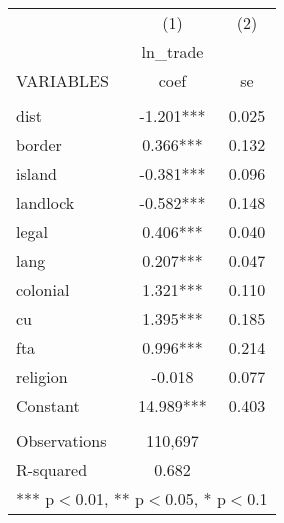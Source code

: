 \documentclass[]{article}
\begin{document}
\begin{tabular}{lcc} \hline
 & (1) & (2) \\
 & ln\_trade &  \\
VARIABLES & coef & se \\ \hline
 &  &  \\
dist & -1.201*** & 0.025 \\
border & 0.366*** & 0.132 \\
island & -0.381*** & 0.096 \\
landlock & -0.582*** & 0.148 \\
legal & 0.406*** & 0.040 \\
lang & 0.207*** & 0.047 \\
colonial & 1.321*** & 0.110 \\
cu & 1.395*** & 0.185 \\
fta & 0.996*** & 0.214 \\
religion & -0.018 & 0.077 \\
Constant & 14.989*** & 0.403 \\
 &  &  \\
Observations & 110,697 &  \\
 R-squared & 0.682 &  \\ \hline
\multicolumn{3}{c}{ *** p$<$0.01, ** p$<$0.05, * p$<$0.1} \\
\end{tabular}
\end{document}
